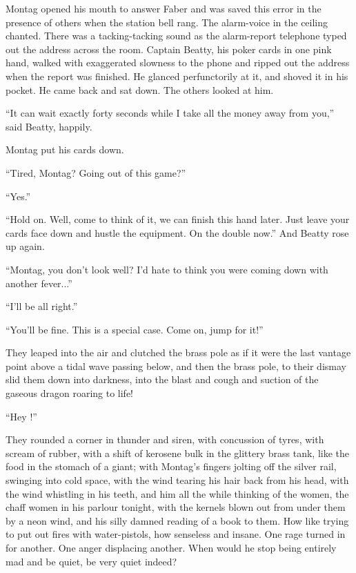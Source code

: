 \documentclass[11pt,openany]{book}
\begin{document}
Montag opened his mouth to answer Faber and was saved this error in the presence of others when the station bell rang. The alarm-voice in the ceiling chanted. There was a tacking-tacking sound as the alarm-report telephone typed out the address across the room. Captain Beatty, his poker cards in one pink hand, walked with exaggerated slowness to the phone and ripped out the address when the report was finished. He glanced perfunctorily at it, and shoved it in his pocket. He came back and sat down. The others looked at him.

``It can wait exactly forty seconds while I take all the money away from you,'' said Beatty, happily.

Montag put his cards down.

``Tired, Montag? Going out of this game?''

``Yes.''

``Hold on. Well, come to think of it, we can finish this hand later. Just leave your cards face down and hustle the equipment. On the double now.'' And Beatty rose up again.

``Montag, you don't look well? I'd hate to think you were coming down with another fever...''

``I'll be all right.''

``You'll be fine. This is a special case. Come on, jump for it!''

They leaped into the air and clutched the brass pole as if it were the last vantage point above a tidal wave passing below, and then the brass pole, to their dismay slid them down into darkness, into the blast and cough and suction of the gaseous dragon roaring to life!

``Hey !''

They rounded a corner in thunder and siren, with concussion of tyres, with scream of rubber, with a shift of kerosene bulk in the glittery brass tank, like the food in the stomach of a giant; with Montag's fingers jolting off the silver rail, swinging into cold space, with the wind tearing his hair back from his head, with the wind whistling in his teeth, and him all the while thinking of the women, the chaff women in his parlour tonight, with the kernels blown out from under them by a neon wind, and his silly damned reading of a book to them. How like trying to put out fires with water-pistols, how senseless and insane. One rage turned in for another. One anger displacing another. When would he stop being entirely mad and be quiet, be very quiet indeed?
\end{document}
